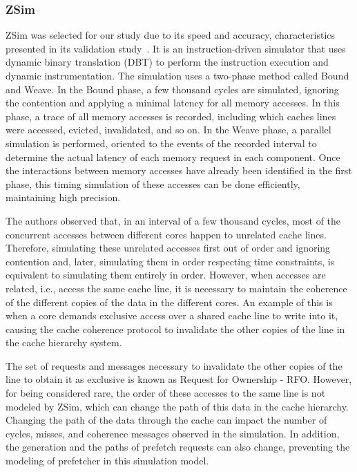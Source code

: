 \documentclass[AMA,final,STIX1COL]{WileyNJD-v2}
\begin{document}
\subsubsection{ZSim}\label{ref:subs_zsim}

ZSim was selected for our study due to its speed and accuracy, characteristics presented in its validation study~\cite{ZSim2016validation}.
It is an instruction-driven simulator that uses dynamic binary translation (DBT) to perform the instruction execution and dynamic instrumentation.
The simulation uses a two-phase method called Bound and Weave.
In the Bound phase, a few thousand cycles are simulated, ignoring the contention and applying a minimal latency for all memory accesses.
In this phase, a trace of all memory accesses is recorded, including which caches lines were accessed, evicted, invalidated, and so on.
In the Weave phase, a parallel simulation is performed, oriented to the events of the recorded interval to determine the actual latency of each memory request in each component.
Once the interactions between memory accesses have already been identified in the first phase, this timing simulation of these accesses can be done efficiently, maintaining high precision.

The authors observed that, in an interval of a few thousand cycles, most of the concurrent accesses between different cores happen to unrelated cache lines.
Therefore, simulating these unrelated accesses first out of order and ignoring contention and, later, simulating them in order respecting time constraints, is equivalent to simulating them entirely in order.
However, when accesses are related, i.e., access the same cache line, it is necessary to maintain the coherence of the different copies of the data in the different cores.
An example of this is when a core demands exclusive access over a shared cache line to write into it, causing the cache coherence protocol to invalidate the other copies of the line in the cache hierarchy system.

The set of requests and messages necessary to invalidate the other copies of the line to obtain it as exclusive is known as Request for Ownership - RFO.
However, for being considered rare, the order of these accesses to the same line is not modeled by ZSim, which can change the path of this data in the cache hierarchy.
Changing the path of the data through the cache can impact the number of cycles, misses, and coherence messages observed in the simulation.
In addition, the generation and the paths of prefetch requests can also change, preventing the modeling of prefetcher in this simulation model.
\end{document}
